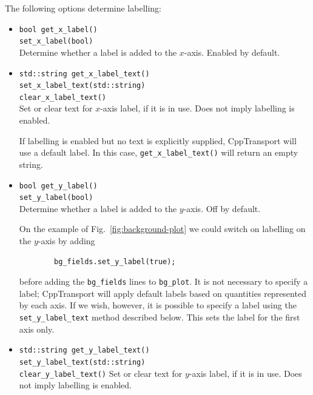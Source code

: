\documentclass[11pt,a4paper]{article}
\newcommand{\packagefont}{\sffamily}
\newcommand{\CppTransport}{{\packagefont CppTransport}}
\newcommand{\semibold}[1]{{\fontseries{b}\selectfont{#1}}}
\newcommand{\para}[1]{\par\vspace{2mm}\noindent\semibold{{#1.}---}\ignorespaces}
\begin{document}
\para{Labelling}
The following options determine labelling:
\begin{itemize}
    \item \texttt{bool get_x_label()} \\
    \texttt{set_x_label(bool)} \\
    Determine whether a label is added to the $x$-axis. Enabled by default.
    
    \item \texttt{std::string get_x_label_text()} \\
    \texttt{set_x_label_text(std::string)} \\
    \texttt{clear_x_label_text()} \\
    Set or clear
    text for $x$-axis label, if it is in use. Does not imply labelling is enabled.
    
    If labelling is enabled but no text is explicitly supplied, {\CppTransport}
    will use a default label.
    In this case, \texttt{get_x_label_text()} will return an empty string.
    
    \item \texttt{bool get_y_label()} \\
    \texttt{set_y_label(bool)} \\
    Determine whether a label is added to the $y$-axis. Off by default.
    
    On the example of Fig.~\ref{fig:background-plot}
    we could switch on labelling on the $y$-axis by adding
    \begin{verbatim}
        bg_fields.set_y_label(true);    
    \end{verbatim}
    before adding the \texttt{bg_fields} lines to
    \texttt{bg_plot}.
    It is not necessary to specify a label; {\CppTransport} will
    apply default labels based on quantities represented by each axis.
    If we wish, however, it is possible to specify a label
    using the \texttt{set_y_label_text} method described below.
    This sets the label for the first axis only.
    
    \item \texttt{std::string get_y_label_text()} \\
    \texttt{set_y_label_text(std::string)} \\
    \texttt{clear_y_label_text()}
    Set or clear
    text for $y$-axis label, if it is in use. Does not imply labelling is enabled.
    

\end{itemize}
\end{document}
